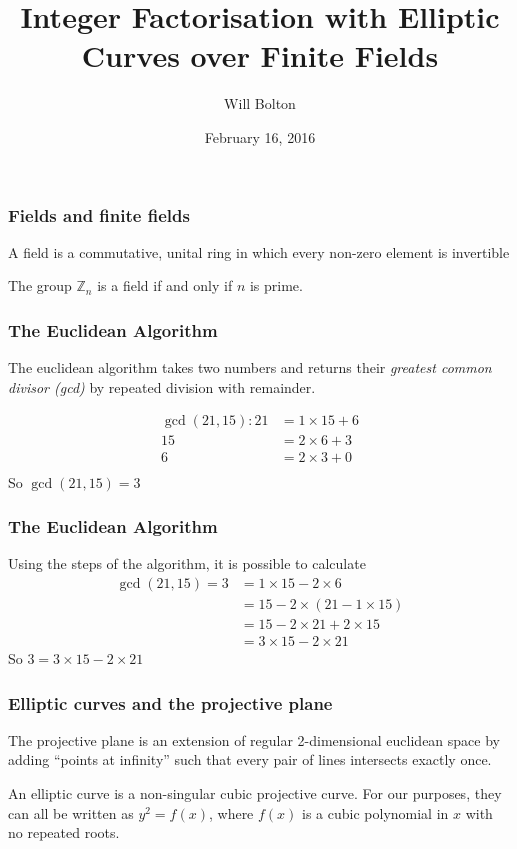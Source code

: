 \documentclass{beamer}
\title[Integer Factorisation with Elliptic Curves over Finite Fields]{Integer Factorisation with Elliptic Curves over Finite Fields}
\author{Will Bolton}
\date{February 16, 2016}
\begin{document}
\titlepage %
\begin{frame} %
\frametitle{Fields and finite fields}
\begin{definition}
	A field is a commutative, unital ring in which every non-zero element is invertible
\end{definition}
\vfill
	The group $\mathbb{Z}_n$ is a field if and only if $n$ is prime.
\end{frame}

\begin{frame} %
\frametitle{The Euclidean Algorithm}
\begin{definition}
	The euclidean algorithm takes two numbers and returns their \emph{greatest common divisor (gcd)} by repeated division with remainder.
\end{definition}
\begin{align*}
	\gcd(21,15):21 &= 1\times15 + 6\\
	15 &= 2\times6 + 3\\
	6 &= 2\times3 + 0\\
\end{align*}
So $\gcd(21,15)=3$
\end{frame}

\begin{frame} %
\frametitle{The Euclidean Algorithm}
Using the steps of the algorithm, it is possible to calculate
\begin{align*}
	\gcd(21,15) = 3 &= 1\times15 - 2\times6\\
	&= 15 - 2\times(21 - 1\times15)\\
	&= 15 - 2\times21 + 2\times15\\
	&=3\times15 - 2\times21
\end{align*}
So $3 = 3\times15 - 2\times21$
\end{frame}

\begin{frame} %
\frametitle{Elliptic curves and the projective plane}
\begin{definition}
	The projective plane is an extension of regular 2-dimensional euclidean space by adding ``points at infinity'' such that every pair of lines intersects exactly once.
\end{definition}
\begin{definition}
	An elliptic curve is a non-singular cubic projective curve. For our purposes, they can all be written as $y^2 = f(x)$, where $f(x)$ is a cubic polynomial in $x$ with no repeated roots.
\end{definition}
\end{frame}
\end{document}
